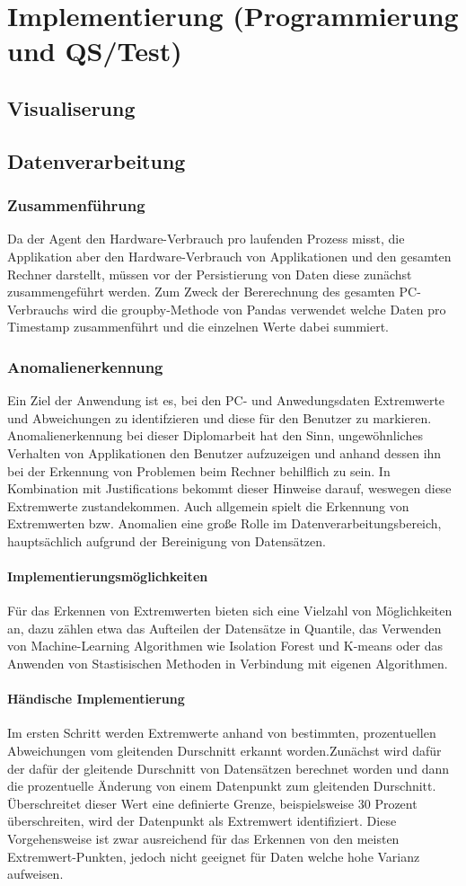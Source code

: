 \documentclass{report}
\begin{document}
\chapter{Implementierung (Programmierung und QS/Test)}
\section{Visualiserung}
\section{Datenverarbeitung}
\subsection{Zusammenführung}
Da der Agent den Hardware-Verbrauch pro laufenden Prozess misst, die Applikation aber den Hardware-Verbrauch von Applikationen und den gesamten Rechner darstellt, müssen vor der Persistierung von Daten diese zunächst zusammengeführt werden. Zum Zweck der Bererechnung des gesamten PC-Verbrauchs wird die groupby-Methode von Pandas verwendet welche Daten pro Timestamp zusammenführt und die einzelnen Werte dabei summiert.
\subsection{Anomalienerkennung}
Ein Ziel der Anwendung ist es, bei den PC- und Anwedungsdaten Extremwerte und Abweichungen zu identifzieren und diese für den Benutzer zu markieren. Anomalienerkennung bei dieser Diplomarbeit hat den Sinn, ungewöhnliches Verhalten von Applikationen den Benutzer aufzuzeigen und anhand dessen ihn bei der Erkennung von Problemen beim Rechner behilflich zu sein. In Kombination mit Justifications bekommt dieser Hinweise darauf, weswegen diese Extremwerte zustandekommen. Auch allgemein spielt die Erkennung von Extremwerten bzw. Anomalien eine große Rolle im Datenverarbeitungsbereich, hauptsächlich aufgrund der Bereinigung von Datensätzen.
\subsubsection{Implementierungsmöglichkeiten}
Für das Erkennen von Extremwerten bieten sich eine Vielzahl von Möglichkeiten an, dazu zählen etwa das Aufteilen der Datensätze in Quantile, das Verwenden von Machine-Learning Algorithmen wie Isolation Forest und K-means oder das Anwenden von Stastisischen Methoden in Verbindung mit eigenen Algorithmen. 
\subsubsection{Händische Implementierung}
Im ersten Schritt werden Extremwerte anhand von bestimmten, prozentuellen Abweichungen vom gleitenden Durschnitt erkannt worden.Zunächst wird dafür der dafür der gleitende Durschnitt von Datensätzen berechnet worden und dann die prozentuelle Änderung von einem Datenpunkt zum gleitenden Durschnitt. Überschreitet dieser Wert eine definierte Grenze, beispielsweise 30 Prozent überschreiten, wird der Datenpunkt als Extremwert identifiziert.
Diese Vorgehensweise ist zwar ausreichend für das Erkennen von den meisten Extremwert-Punkten, jedoch nicht geeignet für Daten welche hohe Varianz aufweisen. 
\end{document}
